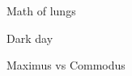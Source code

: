 



%
%



\begin{project}{Math of lungs}
	\label{proj:lungs}

	
\end{project}








%
%



\begin{project}{Dark day}
	\label{proj:zombies}

	
\end{project}









%
%



\begin{project}{Maximus vs Commodus}
	\label{proj:maximus}

	
\end{project}




